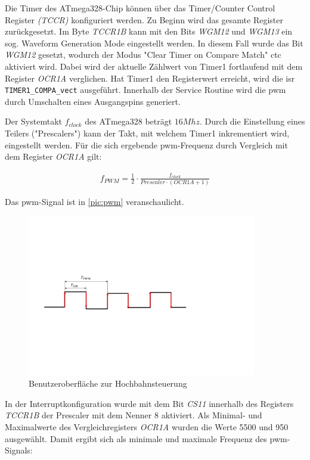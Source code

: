 Die Timer des ATmega328-Chip können über das Timer/Counter Control Register \textit{(TCCR)} konfiguriert werden. Zu Beginn wird das gesamte Register zurückgesetzt. Im Byte \textit{TCCR1B} kann mit den Bits \textit{WGM12} und \textit{WGM13} ein sog. Waveform Generation Mode eingestellt werden. In diesem Fall wurde das Bit \textit{WGM12} gesetzt, wodurch der Modus "Clear Timer on Compare Match" \acrshort{ctc} aktiviert wird. 
Dabei wird der aktuelle Zählwert von Timer1 fortlaufend mit dem Register \textit{OCR1A} verglichen. Hat Timer1 den Registerwert erreicht, wird die \acrshort{isr}  \texttt{TIMER1\_COMPA\_vect} ausgeführt. Innerhalb der Service Routine wird die \acrshort{pwm} durch Umschalten eines Ausgangspins generiert. \newpage

Der Systemtakt $f_{clock}$ des ATmega328 beträgt $16 Mhz$. Durch die Einstellung eines Teilers ("Prescalers") kann der Takt, mit welchem Timer1 inkrementiert wird, eingestellt werden. Für die sich ergebende \acrshort{pwm}-Frequenz durch Vergleich mit dem Register \textit{OCR1A} gilt: 

\begin{align}
	f_{PWM} = \frac{1}{2} \cdot \frac{f_{clock}}{Prescaler \cdot (OCR1A+1)}
\end{align}

Das  \acrshort{pwm}-Signal ist in \autoref{pic:pwm} veranschaulicht. 

\begin{figure}[h]
	\begin{center}
		\includegraphics[width=10cm]{pwm.pdf}
		\caption{Benutzeroberfläche zur Hochbahnsteuerung}
		\label{pic:pwm}
	\end{center}
\end{figure}

In der Interruptkonfiguration wurde mit dem Bit \textit{CS11} innerhalb des Registers \textit{TCCR1B} der Prescaler mit dem Nenner 8 aktiviert. Als Minimal- und Maximalwerte des Vergleichregisters \textit{OCR1A} wurden die Werte 5500 und 950 ausgewählt. Damit ergibt sich als minimale und maximale Frequenz des \acrshort{pwm}-Signals:

